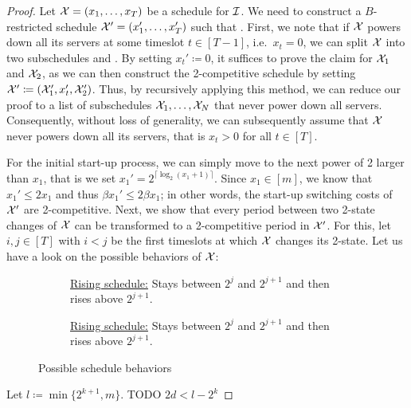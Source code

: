 \begin{proof}
Let $\mathcal{X}=(x_1,\dotsc,x_T)$ be a schedule for $\mathcal{I}$. We need to construct a $B$-restricted schedule $\mathcal{X}'=(x_1',\dotsc,x_T')$ such that .
First, we note that if $\mathcal{X}$ powers down all its servers at some timeslot $t\in[T-1]$, i.e.\ $x_t=0$, we can split $\mathcal{X}$ into two subschedules  and . By setting $x_t'\coloneqq0$, it suffices to prove the claim for $\mathcal{X}_1$ and $\mathcal{X}_2$, as we can then construct the 2-competitive schedule by setting $\mathcal{X}'\coloneqq(\mathcal{X}_1',x_t',\mathcal{X}_2')$. Thus, by recursively applying this method, we can reduce our proof to a list of subschedules $\mathcal{X}_1,\dotsc,\mathcal{X}_N$ that never power down all servers. Consequently, without loss of generality, we can subsequently assume that $\mathcal{X}$ never powers down all its servers, that is $x_t>0$ for all $t\in[T]$. 
	
For the initial start-up process, we can simply move to the next power of 2 larger than $x_1$, that is we set $x_1'=2^{\lceil\log_2(x_1+1)\rceil}$. Since $x_1\in[m]$, we know that $x_1'\le2x_1$ and thus $\beta x_1'\le2\beta x_1$; in other words, the start-up switching costs of $\mathcal{X}'$ are 2-competitive. Next, we show that every period between two 2-state changes of $\mathcal{X}$ can be transformed to a 2-competitive period in $\mathcal{X}'$. For this, let $i,j\in[T]$ with $i<j$ be the first timeslots at which $\mathcal{X}$ changes its 2-state. Let us have a look on the possible behaviors of $\mathcal{X}$:
\begin{figure}[H]
\captionsetup[subfigure]{labelformat=empty}
\begin{subfigure}[b]{0.47\textwidth}
	
\caption{\underline{Rising schedule:} Stays between $2^j$ and $2^{j+1}$ and then rises above $2^{j+1}$.}
\end{subfigure}
\hfill
\begin{subfigure}[b]{0.47\textwidth}
	
\caption{\underline{Rising schedule:} Stays between $2^j$ and $2^{j+1}$ and then rises above $2^{j+1}$.}
\end{subfigure}
\caption{Possible schedule behaviors}
\end{figure}

Let $l\coloneqq\min\{2^{k+1},m\}$. TODO $2d<l-2^k$


\end{proof}
